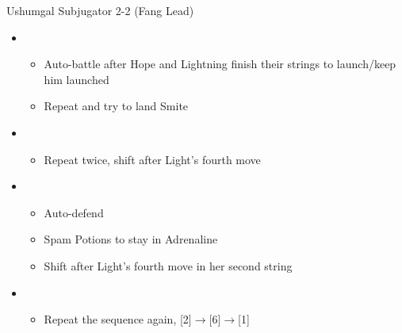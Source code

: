 \begin{multicols}{2}
\begin{battle}[2:21]{Ushumgal Subjugator 2-2 (Fang Lead)}
\begin{itemize}
\begin{itemize}
            \end{itemize}
      \item \first
            \begin{itemize}
              \item Auto-battle after Hope and Lightning finish their strings to launch/keep him launched
              \item Repeat and try to land Smite
            \end{itemize}
      \item \third
            \begin{itemize}
              \item Repeat twice, shift after Light's fourth move
            \end{itemize}
      \item \fourth
            \begin{itemize}
              \item Auto-defend
              \item Spam Potions to stay in Adrenaline
              \item Shift after Light's fourth move in her second string
            \end{itemize}
      \item \second
            \begin{itemize}
              \item Repeat the sequence again, [2]$\rightarrow$[6]$\rightarrow$[1]
            \end{itemize}
    \end{itemize}
  \end{battle}
\end{multicols}
\newpage
